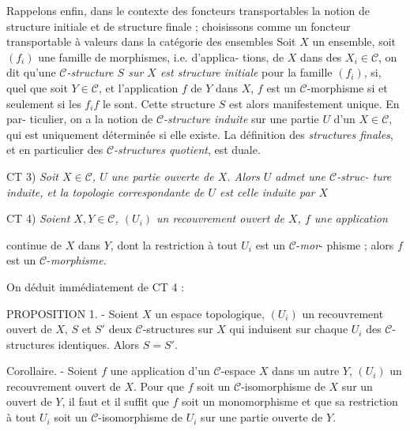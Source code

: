 Rappelons enfin, dans le contexte des foncteurs transportables la
notion de structure initiale et de structure finale ; choisissons
comme un foncteur transportable à valeurs dans la catégorie des ensembles
Soit $X$ un ensemble, soit $(f_i)$ une famille de morphismes, i.e. d'applica-
tions, de $X$ dans des $X_i \in \mathcal{C}$, on dit qu'une \emph{$\mathcal{C}$-structure $S$ sur $X$ est
structure initiale} pour la famille $(f_i)$, si, quel que soit $Y \in \mathcal{C}$, et
l'application $f$ de $Y$ dans $X$, $f$ est un $\mathcal{C}$-morphisme si et seulement si les
$f_i f$ le sont. Cette structure $S$ est alors manifestement unique. En par-
ticulier, on a la notion de \emph{$\mathcal{C}$-structure induite} sur une partie $U$ d'un
$X \in \mathcal{C}$, qui est uniquement déterminée si elle existe. La définition des
\emph{structures finales}, et en particulier des \emph{$\mathcal{C}$-structures quotient}, est
duale.

CT 3) \emph{Soit $X \in \mathcal{C}$, $U$ une partie ouverte de $X$. Alors $U$ admet une $\mathcal{C}$-struc-
ture induite, et la topologie correspondante de $U$ est celle induite
par $X$}

CT 4) \emph{Soient $X, Y \in \mathcal{C}$, $(U_i)$ un recouvrement ouvert de $X$, $f$ une application}

\newpage



continue de $X$ dans $Y$, dont la restriction à tout $U_i$ est un $\mathcal{C}$-\emph{mor}-
phisme ; alors $f$ est un $\mathcal{C}$-\emph{morphisme}.

On déduit immédiatement de CT 4 :

PROPOSITION 1. - Soient $X$ un espace topologique, $(U_i)$ un recouvrement
ouvert de $X$, $S$ et $S'$ deux $\mathcal{C}$-structures sur $X$ qui induisent sur chaque
$U_i$ des $\mathcal{C}$-structures identiques. Alors $S = S'$.

Corollaire. - Soient $f$ une application d'un $\mathcal{C}$-espace $X$ dans un autre
$Y$, $(U_i)$ un recouvrement ouvert de $X$. Pour que $f$ soit un $\mathcal{C}$-isomorphisme de
$X$ sur un ouvert de $Y$, il faut et il suffit que $f$ soit un monomorphisme
et que sa restriction à tout $U_i$ soit un $\mathcal{C}$-isomorphisme de $U_i$ sur une
partie ouverte de $Y$.

